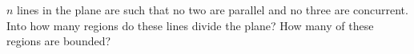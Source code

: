 $n$ lines in the plane are such that no two are parallel and no three are concurrent. Into how many regions do these lines divide the plane? How many of these regions are bounded?
